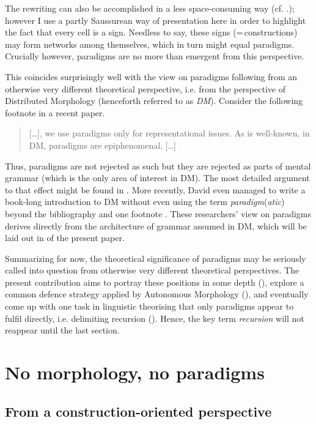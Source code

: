 \documentclass[output=paper]{langsci/langscibook}
\begin{document}
The rewriting can also be accomplished in a less space-consuming way (cf. .); however I use a partly Saussurean way of presentation here in order to highlight the fact that every cell is a sign. Needless to say, these signs (=\,constructions) may form networks among themselves, which in turn might equal paradigms. Crucially however, paradigms are no more than emergent from this perspective.

This coincides surprisingly well with the view on paradigms following from an otherwise very different theoretical perspective, i.e. from the perspective of Distributed Morphology (henceforth referred to as \textit{DM}). Consider the following footnote in a recent paper.

\begin{quote}
[…], we use paradigms only for representational issues. As is well-known, in DM, paradigms are epiphenomenal. […] \citep[473]{PominoPomino2019}
\end{quote}

Thus, paradigms are not rejected as such but they are rejected as parts of mental grammar (which is the only area of interest in DM). The most detailed argument to that effect might be found in \citet{Bobaljik2002}. More recently, David \citet{Embick2015} even managed to write a book-long introduction to DM without even using the term \textit{paradigm}(\textit{atic}) beyond the bibliography and one footnote \citep[232]{Embick2015}. These researchers’ view on paradigms derives directly from the architecture of grammar assumed in DM, which will be laid out in  of the present paper.

Summarizing for now, the theoretical significance of paradigms may be seriously called into question from otherwise very different theoretical perspectives. The present contribution aims to portray these positions in some depth (), explore a common defence strategy applied by Autonomous Morphology (), and eventually come up with one task in linguistic theorising that only paradigms appear to fulfil directly, i.e. delimiting recursion (). Hence, the key term \textit{recursion} will not reappear until the last section.

\section{No morphology, no paradigms} \label{reiner:2}
\subsection{From a construction-oriented perspective} \label{reiner:2.1}
\end{document}
